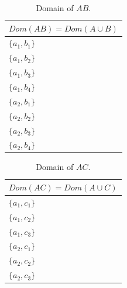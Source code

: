 \begin{table}[]
\centering
\begin{tabular}{|l|}
      $Dom(AB) = Dom(A \cup B )$  \\
      \hline
$\lbrace a_1, b_1  \rbrace$ \\ \hline
$\lbrace a_1, b_2  \rbrace$ \\ \hline
$\lbrace a_1, b_3  \rbrace$ \\ \hline
$\lbrace a_1, b_4  \rbrace$ \\ \hline
$\lbrace a_2, b_1  \rbrace$ \\ \hline
$\lbrace a_2, b_2  \rbrace$ \\ \hline
$\lbrace a_2, b_3  \rbrace$ \\ \hline
$\lbrace a_2, b_4  \rbrace$ \\ \hline
\end{tabular}
\caption{Domain of $AB$.} 
\label{tab:sampleVar:AB}
\end{table}

\begin{table}[]
\centering
\begin{tabular}{|l|}
      $Dom(AC) = Dom(A \cup C )$  \\
      \hline
$\lbrace a_1, c_1  \rbrace$ \\ \hline
$\lbrace a_1, c_2  \rbrace$ \\ \hline
$\lbrace a_1, c_3  \rbrace$ \\ \hline
$\lbrace a_2, c_1  \rbrace$ \\ \hline
$\lbrace a_2, c_2  \rbrace$ \\ \hline
$\lbrace a_2, c_3  \rbrace$ \\ \hline
\end{tabular}
\caption{Domain of $AC$.} 
\label{tab:sampleVar:AC}
\end{table}

